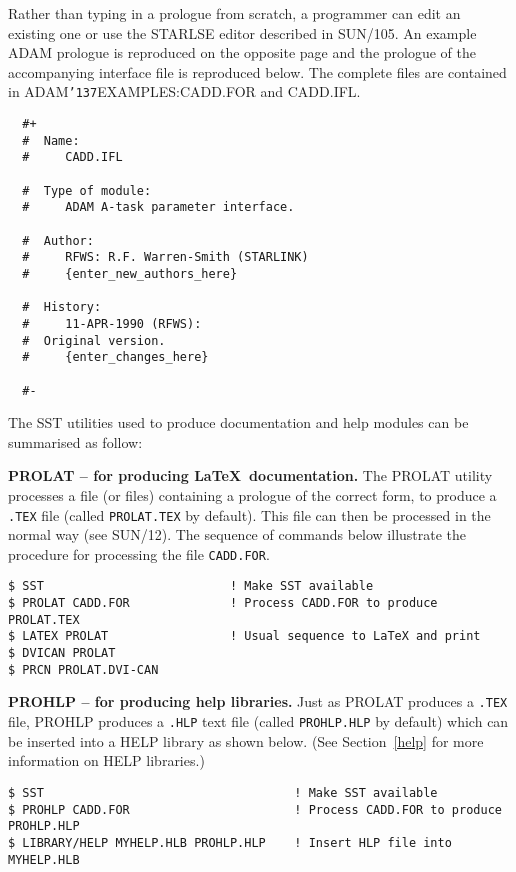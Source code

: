\documentclass[twoside,11pt]{article}
\renewcommand{\_}{{\tt\char'137}}
\newcommand{\xref}[3]{#1}
\begin{document}
Rather than typing in a prologue from scratch, a programmer can edit an
existing one or use the STARLSE editor described in \xref{SUN/105}{sun105}{}.
An example ADAM prologue is reproduced on the opposite page and the
prologue of the accompanying interface file is reproduced below.
The complete files are contained in ADAM\_EXAMPLES:CADD.FOR and
{  CADD.IFL}.
\begin{verbatim}
  #+
  #  Name:
  #     CADD.IFL

  #  Type of module:
  #     ADAM A-task parameter interface.

  #  Author:
  #     RFWS: R.F. Warren-Smith (STARLINK)
  #     {enter_new_authors_here}

  #  History:
  #     11-APR-1990 (RFWS):
  #	 Original version.
  #     {enter_changes_here}

  #-
\end{verbatim}
The SST utilities used to produce documentation and help modules
can be summarised as follow:
\begin{description}
\item{\bf PROLAT -- for producing \LaTeX\ documentation.}
The PROLAT utility processes a file (or files) containing a prologue
of the correct form,
to produce a {\tt .TEX} file (called {\tt PROLAT.TEX} by default).
This file can then be processed in the normal way (see \xref{SUN/12}{sun12}{}).
The sequence of commands  below illustrate the procedure for processing
the file {\tt CADD.FOR}.
\begin{verbatim}
$ SST                          ! Make SST available
$ PROLAT CADD.FOR              ! Process CADD.FOR to produce PROLAT.TEX
$ LATEX PROLAT                 ! Usual sequence to LaTeX and print
$ DVICAN PROLAT
$ PRCN PROLAT.DVI-CAN
\end{verbatim}
\item{\bf PROHLP -- for producing help libraries.} Just as PROLAT produces a
{\tt .TEX} file, PROHLP produces a {\tt .HLP} text file (called
{\tt PROHLP.HLP} by default) which can be inserted
into a HELP library as shown below. (See Section~\ref{help} for more
information on HELP libraries.)
\begin{verbatim}
$ SST                                   ! Make SST available
$ PROHLP CADD.FOR                       ! Process CADD.FOR to produce PROHLP.HLP
$ LIBRARY/HELP MYHELP.HLB PROHLP.HLP    ! Insert HLP file into MYHELP.HLB
\end{verbatim}
\end{description}
\newpage
\end{document}

